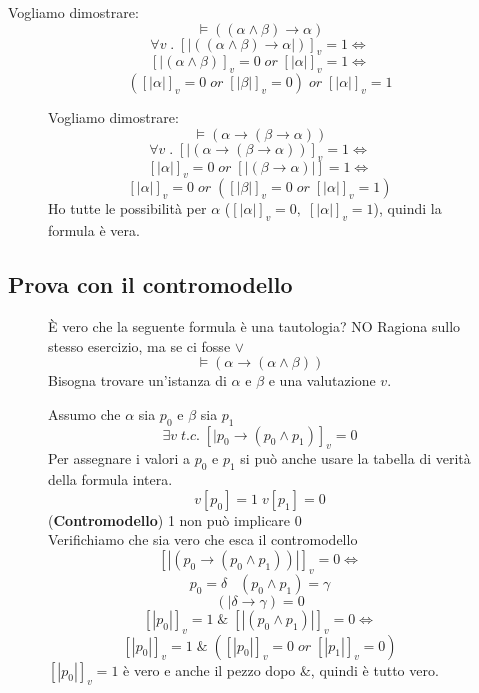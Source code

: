 \documentclass{article}
\theoremstyle{break}
\theoremstyle{break}
\theoremstyle{break}
\theoremstyle{break}
\begin{document}
\begin{exercise}
	Vogliamo dimostrare:
	\[
		\models ((\alpha \wedge \beta) \to \alpha)
	\]
	\[ \forall v\;.\; [|((\alpha \wedge \beta)\to \alpha|)]_v=1 \Leftrightarrow\]
	\[[|(\alpha \wedge \beta)]_v = 0\; or\; [|\alpha|]_v=1 \Leftrightarrow\]
	\[([|\alpha|]_v=0 \; or\; [|\beta|]_v=0)\;or\; [|\alpha|]_v=1\]
\end{exercise}
\begin{figure}[H]
	\begin{exercise}
		Vogliamo dimostrare:
		\[
			\models (\alpha \to (\beta \to \alpha))
		\]
		\[ \forall v\;.\; [|(\alpha \to (\beta \to \alpha))]_v = 1 \Leftrightarrow \]
		\[ [|\alpha|]_v=0 \; or \; [|(\beta \to \alpha)|] = 1 \Leftrightarrow \]
		\[ [|\alpha|]_v = 0 \; or \; ([|\beta|]_v = 0 \; or \; [|\alpha|]_v = 1) \]
		Ho tutte le possibilità per \( \alpha \) (\( [|\alpha|]_v=0,\; [|\alpha|]_v=1\)),
		quindi la formula è vera.
	\end{exercise}
\end{figure}

\subsection{Prova con il contromodello}
\begin{figure}[H]
	\begin{exercise}
		È vero che la seguente formula è una tautologia? NO
		Ragiona sullo stesso esercizio, ma se ci fosse \( \vee \)
		\[
			\models (\alpha \to (\alpha \wedge \beta))
		\]
		Bisogna trovare un'istanza di \( \alpha \) e \( \beta \) e una valutazione \( v \).

		Assumo che \( \alpha \) sia \( p_0 \) e \( \beta \) sia \( p_1 \)
		\[ \exists v\; t.c.\; [|p_0 \to (p_0 \wedge p_1)]_v=0 \]
		Per assegnare i valori a \( p_0 \) e \( p_1 \) si può anche usare
		la tabella di verità della formula intera.
		\[v[p_0]=1\; v[p_1]=0 \] (\textbf{Contromodello}) 1 non può implicare 0\\
		Verifichiamo che sia vero che esca il contromodello
		\[
			[|(p_0 \to (p_0 \wedge p_1))|]_v=0 \Leftrightarrow
		\]\[
			p_0=\delta\; \; \; (p_0 \wedge p_1) = \gamma
		\] \[
			(|\delta \to  \gamma) = 0
		\] \[
			[|p_0|]_v=1 \;\&\; [|(p_0 \wedge p_1)|]_v=0 \Leftrightarrow
		\] \[
			[|p_0|]_v=1 \;\&\; ([|p_0|]_v=0 \; or \; [|p_1|]_v=0)
		\]
		\( [|p_0|]_v=1 \) è vero e anche il pezzo dopo \&, quindi è tutto vero.

	\end{exercise}
\end{figure}
\end{document}
